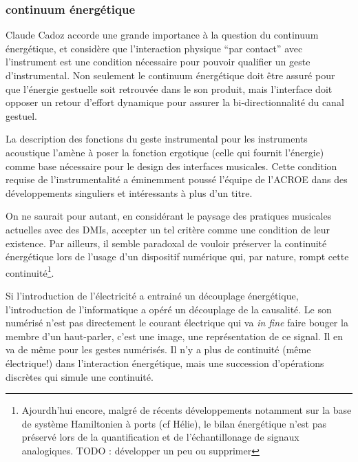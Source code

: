 \subsubsection{continuum énergétique}

Claude Cadoz accorde une grande importance à la question du continuum énergétique, et considère que l'interaction physique ``par contact'' avec l'instrument est une condition nécessaire pour pouvoir qualifier un geste d'instrumental. Non seulement le continuum énergétique doit être assuré pour que l'énergie gestuelle soit retrouvée dans le son produit, mais l'interface doit opposer un retour d'effort dynamique pour assurer la bi-directionnalité du canal gestuel.

\cite{cadoz_musique_1999}

La description des fonctions du geste instrumental pour les instruments acoustique l'amène à poser la fonction ergotique (celle qui fournit l'énergie) comme base nécessaire pour le design des interfaces musicales. Cette condition requise de l'instrumentalité a éminemment poussé l'équipe de l'\gls{ACROE} dans des développements singuliers et intéressants à plus d'un titre. 

On ne saurait pour autant, en considérant le paysage des pratiques musicales actuelles avec des \glspl{DMI}, accepter un tel critère comme une condition de leur existence. Par ailleurs, il semble paradoxal de vouloir préserver la continuité énergétique lors de l'usage d'un dispositif numérique qui, par nature, rompt cette continuité\footnote{Ajourdh'hui encore, malgré de récents développements notamment sur la base de système Hamiltonien à ports (cf Hélie), le bilan énergétique n'est pas préservé lors de la quantification et de l'échantillonage de signaux analogiques. TODO : développer un peu ou supprimer}. 



Si l'introduction de l'électricité a entrainé un découplage énergétique, l'introduction de l'informatique a opéré un découplage de la causalité. Le son numérisé n'est pas directement le courant électrique qui va \textit{in fine} faire bouger la membre d'un haut-parler, c'est une image, une représentation de ce signal. Il en va de même pour les gestes numérisés. Il n'y a plus de continuité (même électrique!) dans l'interaction énergétique, mais une succession d'opérations discrètes qui simule une continuité. 


